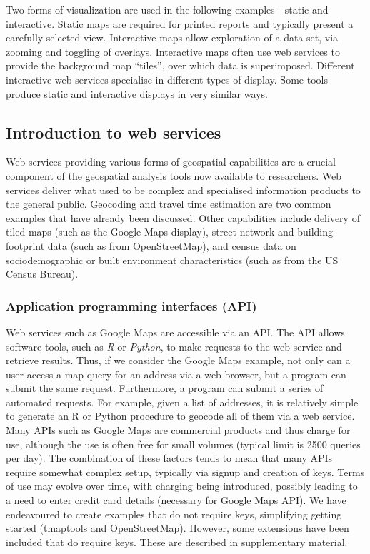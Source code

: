 \documentclass[utf8]{frontiersHLTH}
\begin{document}
Two forms of visualization are used in the following examples - static
and interactive. Static maps are required for printed reports and
typically present a carefully selected view. Interactive maps allow
exploration of a data set, via zooming and toggling of
overlays. Interactive maps often use web services to provide the
background map ``tiles'', over which data is superimposed. Different
interactive web services specialise in different types of
display. Some tools produce static and interactive displays in very
similar ways.

\subsection{Introduction to web services}\label{introduction-to-web-services}

Web services providing various forms of geospatial capabilities are a
crucial component of the geospatial analysis tools now available to
researchers. Web services deliver what used to be complex and
specialised information products to the general public. Geocoding and
travel time estimation are two common examples that have already been
discussed. Other capabilities include delivery of tiled maps (such as
the Google Maps display), street network and building footprint data
(such as from OpenStreetMap), and census data on sociodemographic or
built environment characteristics (such as from the US Census Bureau).

\subsubsection{Application programming interfaces (API)}\label{application-programming-interfaces-api} 
Web services such as Google Maps are accessible via an API. The API
allows software tools, such as {\em R} or {\em Python}, to make
requests to the web service and retrieve results. Thus, if we consider
the Google Maps example, not only can a user access a map query for an
address via a web browser, but a program can submit the same
request. Furthermore, a program can submit a series of automated
requests. For example, given a list of addresses, it is relatively
simple to generate an R or Python procedure to geocode all of them via
a web service. Many APIs such as Google Maps are commercial products
and thus charge for use, although the use is often free for small
volumes (typical limit is 2500 queries per day). The combination of
these factors tends to mean that many APIs require somewhat complex
setup, typically via signup and creation of keys. Terms of use may
evolve over time, with charging being introduced, possibly leading to
a need to enter credit card details (necessary for Google Maps API). We have endeavoured to create
examples that do not require keys, simplifying getting
started (tmaptools and OpenStreetMap). However, some extensions have been included that do require
keys. These are described in supplementary material.
\end{document}
